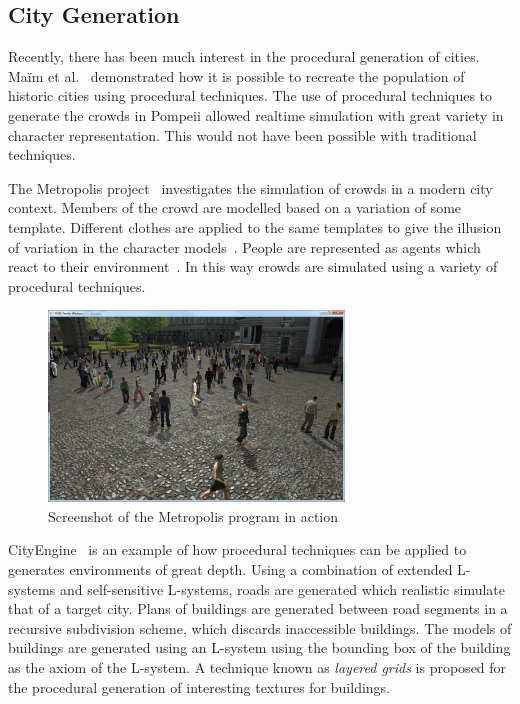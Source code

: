 \subsection{City Generation}
Recently, there has been much interest in the procedural generation of cities.
Ma\"{i}m et al.~\cite{maim2007populating} demonstrated how it is possible to recreate the population of historic cities using procedural techniques.
The use of procedural techniques to generate the crowds in Pompeii allowed realtime simulation with great variety in character representation.
This would not have been possible with traditional techniques.

The Metropolis project~\cite{web:metropolis} investigates the simulation of crowds in a modern city context.
Members of the crowd are modelled based on a variation of some template.
Different clothes are applied to the same templates to give the illusion of variation in the character models~\cite{mcdonnell2007pipeline}.
People are represented as agents which react to their environment~\cite{ulicny2002towards}.
In this way crowds are simulated using a variety of procedural techniques.

\begin{figure}
  \centering
    \includegraphics[width=0.7\textwidth]{images/metropolis}
  \caption{Screenshot of the Metropolis program in action}
\end{figure}

CityEngine~\cite{parish2001procedural} is an example of how procedural techniques can be applied to generates environments of great depth.
Using a combination of extended L-systems and self-sensitive L-systems, roads are generated which realistic simulate that of a target city.
Plans of buildings are generated between road segments in a recursive subdivision scheme, which discards inaccessible buildings.
The models of buildings are generated using an L-system using the bounding box of the building as the axiom of the L-system.
A technique known as \emph{layered grids} is proposed for the procedural generation of interesting textures for buildings.

